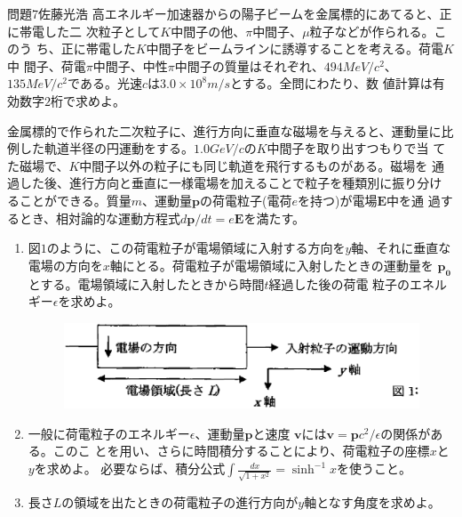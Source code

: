 \documentclass[fleqn]{jbook}
\begin{document}
\begin{question}{問題7}{佐藤光浩}
 高エネルギー加速器からの陽子ビームを金属標的にあてると、正に帯電した二
次粒子として$K$中間子の他、$\pi$中間子、$\mu$粒子などが作られる。このう
ち、正に帯電した$K$中間子をビームラインに誘導することを考える。荷電$K$中
間子、荷電$\pi$中間子、中性$\pi$中間子の質量はそれぞれ、$494MeV/c^2$、
$135MeV/c^2$である。光速$c$は$3.0\times 10^8m/s$とする。全問にわたり、数
値計算は有効数字$2$桁で求めよ。

金属標的で作られた二次粒子に、進行方向に垂直な磁場を与えると、運動量に比
例した軌道半径の円運動をする。$1.0GeV/c$の$K$中間子を取り出すつもりで当
てた磁場で、$K$中間子以外の粒子にも同じ軌道を飛行するものがある。磁場を
通過した後、進行方向と垂直に一様電場を加えることで粒子を種類別に振り分け
ることができる。質量$m$、運動量$\mathbf{p}$の荷電粒子(電荷$e$を持つ)が電場$\mathbf{E}$中を通
過するとき、相対論的な運動方程式$d\mathbf{p}/dt=e\mathbf{E}$を満たす。

\begin{enumerate}

\item
図$1$のように、この荷電粒子が電場領域に入射する方向を$y$軸、それに垂直な
電場の方向を$x$軸にとる。荷電粒子が電場領域に入射したときの運動量を
$\mathbf{p_0}$とする。電場領域に入射したときから時間$t$経過した後の荷電
粒子のエネルギー$\epsilon$を求めよ。

\begin{figure}[htbp]
  \begin{center}
    \includegraphics[width=150mm]{2003phy7-1.eps}
  \end{center}
\end{figure}

\item
一般に荷電粒子のエネルギー$\epsilon$、運動量$\mathbf{p}$と速度
$\mathbf{v}$には$\mathbf{v}=\mathbf{p}c^2/\epsilon$の関係がある。このこ
とを用い、さらに時間積分することにより、荷電粒子の座標$x$と$y$を求めよ。
必要ならば、積分公式$\int \frac{dx}{\sqrt{1+x^2}}=\sinh^{-1}x$を使うこと。

\item
長さ$L$の領域を出たときの荷電粒子の進行方向が$y$軸となす角度を求めよ。


\end{enumerate}
\end{question}
\end{document}
